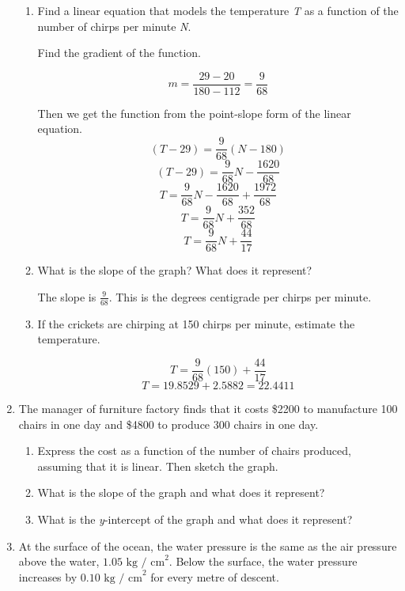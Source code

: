 \documentclass{article}
\begin{document}
\begin{enumerate}
			\begin{enumerate}
				\item Find a linear equation that models the temperature \emph{T} as a function of the number
				of chirps per minute \emph{N}.
				
					Find the gradient of the function.
					
					$$m = \frac{29 - 20}{180 - 112} = \frac{9}{68}$$ 
					
					Then we get the function from the point-slope form of the linear equation.
					$$(T - 29) = \frac{9}{68}(N - 180)$$
					$$(T - 29) = \frac{9}{68}N - \frac{1620}{68}$$
					$$T = \frac{9}{68}N - \frac{1620}{68} + \frac{1972}{68}$$
					$$T = \frac{9}{68}N + \frac{352}{68}$$
					$$T = \frac{9}{68}N + \frac{44}{17}$$
					
				\item What is the slope of the graph? What does it represent?
				
					The slope is $\frac{9}{68}$. This is the degrees centigrade per chirps per minute.
					
				\item If the crickets are chirping at 150 chirps per minute, estimate the temperature.
					
					$$T = \frac{9}{68}(150) + \frac{44}{17}$$
					$$T = 19.8529 + 2.5882 = 22.4411$$
					
			\end{enumerate}
			
		\item The manager of furniture factory finds that it costs \$2200 to manufacture 100 chairs in one 
			day and \$4800 to produce 300 chairs in one day.
			
			\begin{enumerate}
				\item Express the cost as a function of the number of chairs produced, assuming that
				it is linear. Then sketch the graph.
				
				\item What is the slope of the graph and what does it represent?
				
				\item What is the \emph{y}-intercept of the graph and what does it represent?
			\end{enumerate}
			
		\item At the surface of the ocean, the water pressure is the same as the air pressure above the
			water, $1.05 \text{ kg / cm}^{2}$. Below the surface, the water pressure increases by
			$0.10 \text{ kg / cm}^{2}$ for every metre of descent.
			

\end{enumerate}
\end{document}

